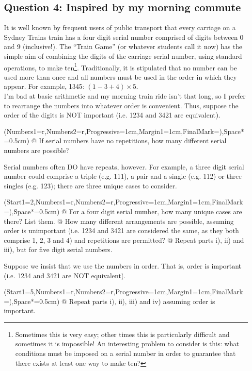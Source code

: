 \documentclass[a4paper,11pt]{article}
\begin{document}
\subsection*{Question 4: Inspired by my morning commute}
It is well known by frequent users of public transport that every carriage on a Sydney Trains train has a four digit serial number comprised of digits between 0 and 9 (inclusive!). The ``Train Game'' (or whatever students call it now) has the simple aim of combining the digits of the carriage serial number, using standard operations, to make ten\footnote{Sometimes this is very easy; other times this is particularly difficult and sometimes it is impossible! An interesting problem to consider is this: what conditions must be imposed on a serial number in order to guarantee that there exists at least one way to make ten?}. Traditionally, it is stipulated that no number can be used more than once and all numbers must be used in the order in which they appear. For example, 1345: $(1-3+4)\times5$.\\

\noindent I'm bad at basic arithmetic and my morning train ride isn't that long, so I prefer to rearrange the numbers into whatever order is convenient. Thus, suppose the order of the digits is NOT important (i.e. 1234 and 3421 are equivalent). \\
	\begin{easylist}[enumerate]
		\ListProperties(Numbers1=r,Numbers2=r,Progressive=1cm,Margin1=1cm,FinalMark={)},Space*=0.5cm)
		@ If serial numbers have no repetitions, how many different serial numbers are possible?
    \end{easylist}
    \vspace{0.5cm}
    \noindent Serial numbers often DO have repeats, however. For example, a three digit serial number could comprise a triple (e.g. 111), a pair and a single (e.g. 112) or three singles (e.g. 123); there are three unique cases to consider.\\
	\begin{easylist}[enumerate]
		\ListProperties(Start1=2,Numbers1=r,Numbers2=r,Progressive=1cm,Margin1=1cm,FinalMark={)},Space*=0.5cm)
        @ For a four digit serial number, how many unique cases are there? List them.
        @ How many different arrangements are possible, assuming order is unimportant (i.e. 1234 and 3421 are considered the same, as they both comprise 1, 2, 3 and 4) and repetitions are permitted?
        @ Repeat parts i), ii) and iii), but for five digit serial numbers.
    \end{easylist}
    \vspace{0.5cm}
\noindent Suppose we insist that we use the numbers in order. That is, order is important (i.e. 1234 and 3421 are NOT equivalent). \\
	\begin{easylist}[enumerate]
		\ListProperties(Start1=5,Numbers1=r,Numbers2=r,Progressive=1cm,Margin1=1cm,FinalMark={)},Space*=0.5cm)
		@ Repeat parts i), ii), iii) and iv) assuming order is important.
    \end{easylist}
    
\end{document}

